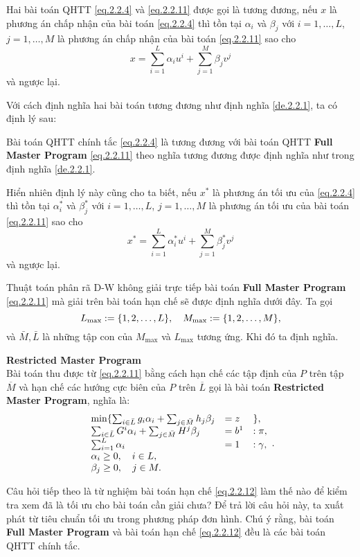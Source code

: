 \begin{definition}\label{de.2.2.1}
Hai bài toán QHTT \eqref{eq.2.2.4} và \eqref{eq.2.2.11} được gọi là tương đương, nếu $x$ là phương án chấp nhận của bài toán \eqref{eq.2.2.4} thì tồn tại $\alpha_i$ và $\beta_j$ với $i=1,\dots, L$, $j=1,\dots, M$ là phương án chấp nhận của bài toán \eqref{eq.2.2.11} sao cho
$$
x = \sum_{i=1}^L\alpha_iu^i + \sum_{j=1}^M\beta_jv^j
$$
và ngược lại.
\end{definition}
Với cách định nghĩa hai bài toán tương đương như định nghĩa \ref{de.2.2.1}, ta có định lý sau:
\begin{theorem}\label{th.2.2.1}
Bài toán QHTT chính tắc \eqref{eq.2.2.4} là tương đương với bài toán QHTT {\bf Full Master Program} \eqref{eq.2.2.11} theo nghĩa tương đương được định nghĩa như trong định nghĩa \ref{de.2.2.1}.
\end{theorem}
Hiển nhiên định lý này cũng cho ta biết, nếu $x^{*}$ là phương án tối ưu của \eqref{eq.2.2.4} thì tồn tại $\alpha_i^{*}$ và $\beta_j^{*}$ với $i=1,\dots, L$, $j=1,\dots, M$ là phương án tối ưu của bài toán \eqref{eq.2.2.11} sao cho
$$
x^{*} = \sum_{i=1}^L\alpha_i^{*}u^i + \sum_{j=1}^M\beta_j^{*}v^j
$$
và ngược lại. 

Thuật toán phân rã D-W không giải trực tiếp bài toán {\bf Full Master Program} \eqref{eq.2.2.11} mà giải trên bài toán hạn chế sẽ được định nghĩa dưới đây.
Ta gọi 
$$
L_{\max} := \{1,2,\dots, L\},\quad M_{\max} := \{1,2,\dots, M\},
$$
và $\bar M, \bar L$ là những tập con của $M_{\max}$ và $L_{\max}$ tương ứng. Khi đó ta định nghĩa.
\begin{definition}\label{de.2.2.2}\textbf{Restricted Master Program}\\
Bài toán thu được từ \eqref{eq.2.2.11} bằng cách hạn chế các tập định của $P$ trên tập $\overline M$ và hạn chế các hướng cực biên của $P$ trên $\overline L$ gọi là bài toán {\bf Restricted Master Program}, nghĩa là:
\begin{equation}\label{eq.2.2.12}
 \begin{array}{llll}
\min\{\sum_{i \in\bar L} g_i\alpha_i + \sum_{j \in\bar M} h_j\beta_j & =z&\},\\
\sum_{i\in\bar L}G^i\alpha_i + \sum_{j \in\bar M} H^j\beta_j & =b^1&:\pi,\\
\sum_{i = 1}^L \alpha_i &= 1&:\gamma,\\
\alpha_i \geq 0, \quad i \in L,\\
\beta_j \geq 0, \quad j\in M.
\end{array}.
\end{equation}
\end{definition}
Câu hỏi tiếp theo là từ nghiệm bài toán hạn chế \eqref{eq.2.2.12} làm thế nào để kiểm tra xem đã là tối ưu cho bài toán cần giải chưa? Để trả lời câu hỏi này, ta xuất phát từ tiêu chuẩn tối ưu trong phương pháp đơn hình. Chú ý rằng, bài toán {\bf Full Master Program} và bài toán hạn chế \eqref{eq.2.2.12} đều là các bài toán QHTT chính tắc. 

